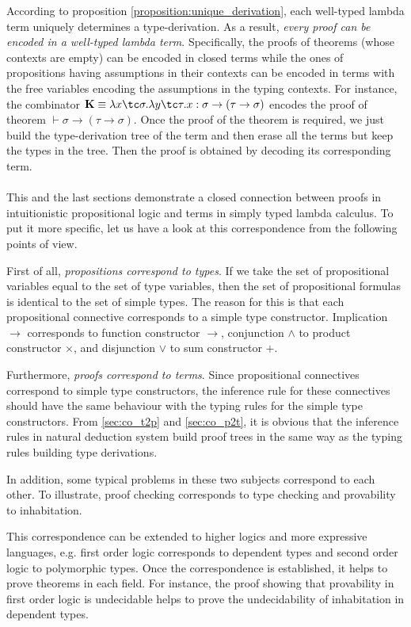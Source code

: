 According to proposition \ref{proposition:unique_derivation}, each well-typed lambda term uniquely determines a type-derivation. As a result, \emph{every proof can be encoded in a well-typed lambda term}. Specifically, the proofs of theorems (whose contexts are empty) can be encoded in closed terms while the ones of propositions having assumptions in their contexts can be encoded in terms with the free variables encoding the assumptions in the typing contexts. For instance, the combinator $ \textbf{K} \equiv \lambda x \tc \sigma . \lambda y \tc \tau . x: \sigma \to (\tau \to \sigma) $ encodes the proof of theorem $ \vdash \sigma \to (\tau \to \sigma) $. Once the proof of the theorem is required, we just build the type-derivation tree of the term and then erase all the terms but keep the types in the tree. Then the proof is obtained by decoding its corresponding term.
\\
\\
This and the last sections demonstrate a closed connection between proofs in intuitionistic propositional logic and terms in simply typed lambda calculus. To put it more specific, let us have a look at this correspondence from the following points of view.

First of all, \emph{propositions correspond to types}. If we take the set of propositional variables equal to the set of type variables, then the set of propositional formulas is identical to the set of simple types. The reason for this is that each propositional connective corresponds to a simple type constructor. Implication $ \to $ corresponds to function constructor $ \to $, conjunction $ \land $ to product constructor $ \times $, and disjunction $ \lor $ to sum constructor $ + $.

Furthermore, \emph{proofs correspond to terms}. Since propositional connectives correspond to simple type constructors, the inference rule for these connectives should have the same behaviour with the typing rules for the simple type constructors. From \ref{sec:co_t2p} and \ref{sec:co_p2t}, it is obvious that the inference rules in natural deduction system build proof trees in the same way as the typing rules building type derivations.

In addition, some typical problems in these two subjects correspond to each other. To illustrate, proof checking corresponds to type checking and provability to inhabitation.

This correspondence can be extended to higher logics and more expressive languages, e.g. first order logic corresponds to dependent types and second order logic to polymorphic types. Once the correspondence is established, it helps to prove theorems in each field. For instance, the proof showing that provability in first order logic is undecidable helps to prove the undecidability of inhabitation in dependent types.